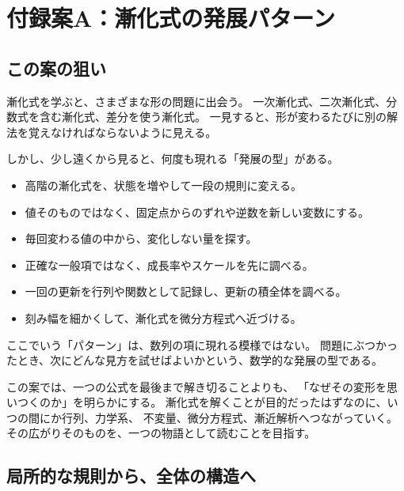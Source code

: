 
\chapter{付録案A：漸化式の発展パターン}

\section*{この案の狙い}

漸化式を学ぶと、さまざまな形の問題に出会う。
一次漸化式、二次漸化式、分数式を含む漸化式、差分を使う漸化式。
一見すると、形が変わるたびに別の解法を覚えなければならないように見える。

しかし、少し遠くから見ると、何度も現れる「発展の型」がある。

\begin{itemize}
  \item 高階の漸化式を、状態を増やして一段の規則に変える。
  \item 値そのものではなく、固定点からのずれや逆数を新しい変数にする。
  \item 毎回変わる値の中から、変化しない量を探す。
  \item 正確な一般項ではなく、成長率やスケールを先に調べる。
  \item 一回の更新を行列や関数として記録し、更新の積全体を調べる。
  \item 刻み幅を細かくして、漸化式を微分方程式へ近づける。
\end{itemize}

ここでいう「パターン」は、数列の項に現れる模様ではない。
問題にぶつかったとき、次にどんな見方を試せばよいかという、数学的な発展の型である。

この案では、一つの公式を最後まで解き切ることよりも、
「なぜその変形を思いつくのか」を明らかにする。
漸化式を解くことが目的だったはずなのに、いつの間にか行列、力学系、
不変量、微分方程式、漸近解析へつながっていく。
その広がりそのものを、一つの物語として読むことを目指す。

\section{局所的な規則から、全体の構造へ}

